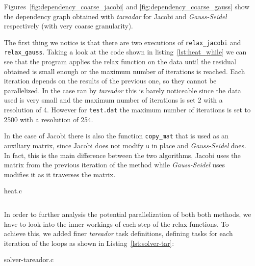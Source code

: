 Figures~\ref{fig:dependency_coarse_jacobi} and \ref{fig:dependency_coarse_gauss}
show the dependency graph obtained with \emph{tareador} for Jacobi and \emph{Gauss-Seidel}
respectively (with very coarse granularity).

The first thing we notice is that there are two executions of
\texttt{relax\_jacobi} and \texttt{relax\_gauss}.  Taking a look at the code
shown in listing~\ref{lst:heat_while} we can see that the program applies the
relax function on the data until the residual obtained is small enough or the
maximum number of iterations is reached. Each iteration depends on the results
of the previous one, so they cannot be parallelized. In the case ran by
\emph{tareador} this is barely noticeable since the data used is very small and
the maximum number of iterations is set 2 with a resolution of 4. However for
\texttt{test.dat} the maximum number of iterations is set to 2500 with a resolution
of 254.

In the case of Jacobi there is also the function \texttt{copy\_mat} that is
used as an auxiliary matrix, since Jacobi does not modify \texttt{u} in place
and \emph{Gauss-Seidel} does.  In fact, this is the main difference between the two
algorithms, Jacobi uses the matrix from the previous iteration of the method
while \emph{Gauss-Seidel} uses modifies it as it traverses the matrix.

\begin{listing}[H]
\caption{heat.c}%
\label{lst:heat_while}
\inputminted[firstline=83,lastline=104]{c}{code/heat.c}
\end{listing}

In order to further analysis the potential parallelization of both both methods,
we have to look into the inner workings of each step of the relax functions. To
achieve this, we added finer \emph{tareador} task definitions, defining tasks
for each iteration of the loops as shown in Listing~\ref{lst:solver-tar}:

\begin{listing}[H]
\caption{solver-tareador.c}%
\label{lst:solver-tar}
\inputminted[firstline=28,lastline=43]{c}{code/solver-tareador.c}
\vspace{-2.5em}
\inputminted[firstline=56,lastline=72]{c}{code/solver-tareador.c}
\end{listing}

